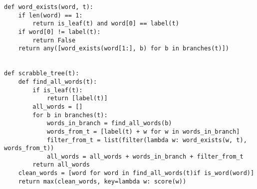 \begin{solution}
\begin{lstlisting}
def word_exists(word, t):
    if len(word) == 1:
        return is_leaf(t) and word[0] == label(t)
    if word[0] != label(t):
        return False
    return any([word_exists(word[1:], b) for b in branches(t)])


def scrabble_tree(t):
    def find_all_words(t):
        if is_leaf(t):
            return [label(t)]
        all_words = []
        for b in branches(t):
            words_in_branch = find_all_words(b)
            words_from_t = [label(t) + w for w in words_in_branch]
            filter_from_t = list(filter(lambda w: word_exists(w, t), words_from_t))
            all_words = all_words + words_in_branch + filter_from_t
        return all_words
    clean_words = [word for word in find_all_words(t)if is_word(word)]
    return max(clean_words, key=lambda w: score(w))

\end{lstlisting}
\end{solution}

